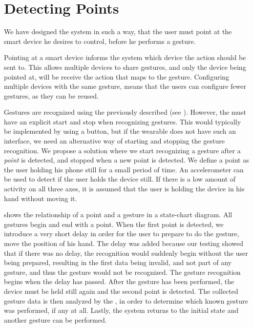 \section{Detecting Points}\label{sec:detecting-points}

We have designed the system in such a way, 
that the user must point at the smart device he desires to control, 
before he performs a gesture.

Pointing at a smart device informs the system which device the action should be sent to. 
This allows multiple devices to share gestures, 
and only the device being pointed at, 
will be receive the action that maps to the gesture. 
Configuring multiple devices with the same gesture, 
means that the users can configure fewer gestures, 
as they can be reused.

Gestures are recognized using the previously described \threedollar (see ). 
However, the \threedollar must have an explicit start and stop when recognizing gestures. 
This would typically be implemented by using a button, 
but if the wearable does not have such an interface,
we need an alternative way of starting and stopping the gesture recognition.
We propose a solution where we start recognizing a gesture after a \emph{point} is detected,
and stopped when a new point is detected. 
We define a point as the user holding his phone still for a small period of time. 
An accelerometer can be used to detect if the user holds the device still. 
If there is a low amount of activity on all three axes, 
it is assumed that the user is holding the device in his hand without moving it.

 shows the relationship of a point and a gesture in a state-chart diagram. 
All gestures begin and end with a point. 
When the first point is detected, 
we introduce a very short delay in order for the user to prepare to do the gesture, 
\eg move the position of his hand. 
The delay was added because our testing showed that if there was no delay, 
the recognition would suddenly begin without the user being prepared, 
resulting in the first data being invalid, 
and not part of any gesture, 
and thus the gesture would not be recognized.
The gesture recognition begins when the delay has passed. 
After the gesture has been performed, 
the device must be held still again and the second point is detected. 
The collected gesture data is then analyzed by the \threedollar, 
in order to determine which known gesture was performed, if any at all. 
Lastly, the system returns to the initial state and another gesture can be performed.

